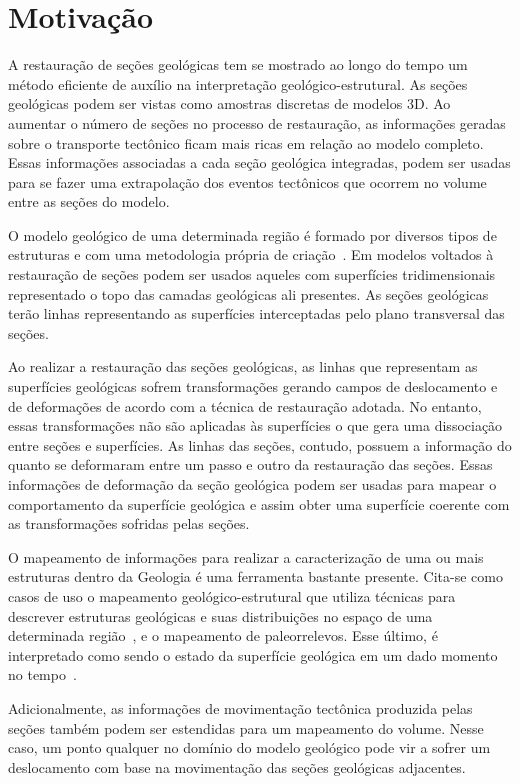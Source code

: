 \section{Motivação}

A restauração de seções geológicas tem se mostrado ao longo do tempo um método eficiente de auxílio na interpretação geológico-estrutural. As seções geológicas podem ser vistas como amostras discretas de modelos 3D. Ao aumentar o número de seções no processo de restauração, as informações geradas sobre o transporte tectônico ficam mais ricas em relação ao modelo completo. Essas informações associadas a cada seção geológica integradas, podem ser usadas para se fazer uma extrapolação dos eventos tectônicos que ocorrem no volume entre as seções do modelo.

O modelo geológico de uma determinada região é formado por diversos tipos de estruturas e com uma metodologia própria de criação~\cite{Rodrigues}. Em modelos voltados à restauração de seções podem ser usados aqueles com superfícies tridimensionais representado o topo das camadas geológicas ali presentes. As seções geológicas terão linhas representando as superfícies interceptadas pelo plano transversal das seções.

Ao realizar a restauração das seções geológicas, as linhas que representam as superfícies geológicas sofrem transformações gerando campos de deslocamento e de deformações de acordo com a técnica de restauração adotada. No entanto, essas transformações não são aplicadas às superfícies o que gera uma dissociação entre seções e superfícies. As linhas das seções, contudo, possuem a informação do quanto se deformaram entre um passo e outro da restauração das seções. Essas informações de deformação da seção geológica podem ser usadas para mapear o comportamento da superfície geológica e assim obter uma superfície coerente com as transformações sofridas pelas seções.

O mapeamento de informações para realizar a caracterização de uma ou mais estruturas dentro da Geologia é uma ferramenta bastante presente. Cita-se como casos de uso o mapeamento geológico-estrutural que utiliza técnicas para descrever estruturas geológicas e suas distribuições no espaço de uma determinada região~\cite{Borges, Felipe}, e o mapeamento de paleorrelevos. Esse último, é interpretado como sendo o estado da superfície geológica em um dado momento no tempo~\cite{Archela}.

Adicionalmente, as informações de movimentação tectônica produzida pelas seções também podem ser estendidas para um mapeamento do volume. Nesse caso, um ponto qualquer no domínio do modelo geológico pode vir a sofrer um deslocamento com base na movimentação das seções geológicas adjacentes.

